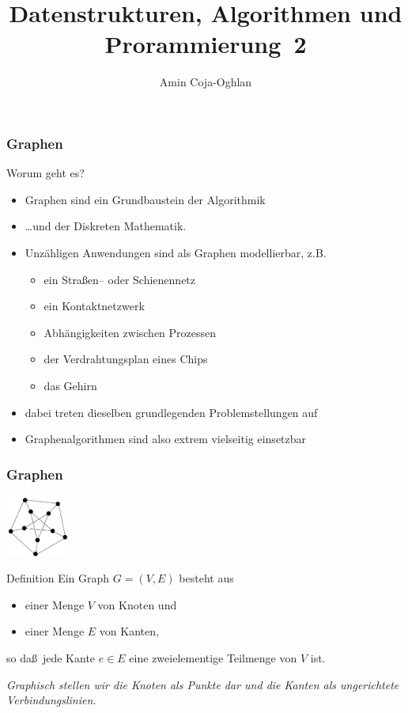 \documentclass[aspectratio=1610, 11pt]{beamer}
\title{Datenstrukturen, Algorithmen und Prorammierung~2}
\author[A.~Coja-Oghlan]{Amin Coja-Oghlan}
\institute[DAP2]{Lehrstuhl Informatik 2\\Fakult\"at f\"ur Informatik}
\newcommand{\mytitle}{Graphen}
\begin{document}
\frame[plain]{\titlepage}

\begin{frame}\frametitle{\mytitle}
	\begin{exampleblock}{Worum geht es?}
		\begin{itemize}
			\item Graphen sind ein Grundbaustein der Algorithmik
			\item \dots und der Diskreten Mathematik.
			\item Unz\"ahligen Anwendungen sind als Graphen modellierbar, z.B.
				\begin{itemize}
					\item ein Stra\ss en-- oder Schienennetz
					\item ein Kontaktnetzwerk
					\item Abh\"angigkeiten zwischen Prozessen
					\item der Verdrahtungsplan eines Chips
					\item das Gehirn
				\end{itemize}
			\item dabei treten dieselben grundlegenden Problemstellungen auf
			\item Graphenalgorithmen sind also extrem vielseitig einsetzbar
		\end{itemize}
	\end{exampleblock}
\end{frame}


\begin{frame}\frametitle{\mytitle}
	\hfill\includegraphics[height=20mm]{images/petersen2.pdf}
	\begin{block}{Definition}
		Ein \alert{Graph} $G=(V,E)$ besteht aus
		\begin{itemize}
			\item einer Menge $V$ von \alert{Knoten} und
			\item einer Menge $E$ von \alert{Kanten},
		\end{itemize}
		so da\ss\ jede Kante $e\in E$ eine zweielementige Teilmenge von $V$ ist.

		\medskip
		\itshape Graphisch stellen wir die Knoten als Punkte dar und die Kanten als ungerichtete Verbindungslinien.
	\end{block}
\end{frame}
\end{document}
